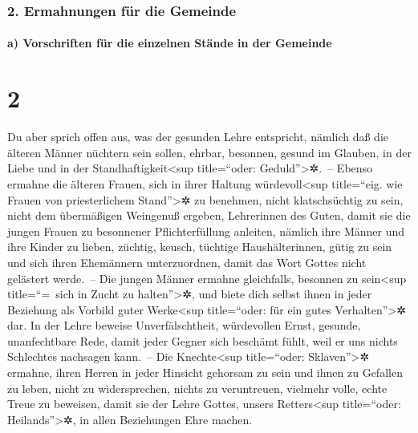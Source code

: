 \hypertarget{ermahnungen-fuxfcr-die-gemeinde}{%
\subsubsection{2. Ermahnungen für die
Gemeinde}\label{ermahnungen-fuxfcr-die-gemeinde}}

\hypertarget{a-vorschriften-fuxfcr-die-einzelnen-stuxe4nde-in-der-gemeinde}{%
\paragraph{a) Vorschriften für die einzelnen Stände in der
Gemeinde}\label{a-vorschriften-fuxfcr-die-einzelnen-stuxe4nde-in-der-gemeinde}}

\hypertarget{section-1}{%
\section{2}\label{section-1}}

 Du aber sprich offen aus, was der gesunden Lehre
entspricht,  nämlich daß die älteren Männer nüchtern sein
sollen, ehrbar, besonnen, gesund im Glauben, in der Liebe und in der
Standhaftigkeit\textless sup title=``oder: Geduld''\textgreater✲.~--
 Ebenso ermahne die älteren Frauen, sich in ihrer Haltung
würdevoll\textless sup title=``eig. wie Frauen von priesterlichem
Stand''\textgreater✲ zu benehmen, nicht klatschsüchtig zu sein, nicht
dem übermäßigen Weingenuß ergeben, Lehrerinnen des Guten, 
damit sie die jungen Frauen zu besonnener Pflichterfüllung anleiten,
nämlich ihre Männer und ihre Kinder zu lieben,  züchtig,
keusch, tüchtige Haushälterinnen, gütig zu sein und sich ihren
Ehemännern unterzuordnen, damit das Wort Gottes nicht gelästert
werde.~--  Die jungen Männer ermahne gleichfalls, besonnen
zu sein\textless sup title=``=~sich in Zucht zu halten''\textgreater✲,
 und biete dich selbst ihnen in jeder Beziehung als
Vorbild guter Werke\textless sup title=``oder: für ein gutes
Verhalten''\textgreater✲ dar. In der Lehre beweise Unverfälschtheit,
würdevollen Ernst,  gesunde, unanfechtbare Rede, damit
jeder Gegner sich beschämt fühlt, weil er uns nichts Schlechtes
nachsagen kann.~--  Die Knechte\textless sup title=``oder:
Sklaven''\textgreater✲ ermahne, ihren Herren in jeder Hinsicht gehorsam
zu sein und ihnen zu Gefallen zu leben, nicht zu widersprechen,
 nichts zu veruntreuen, vielmehr volle, echte Treue zu
beweisen, damit sie der Lehre Gottes, unsers Retters\textless sup
title=``oder: Heilands''\textgreater✲, in allen Beziehungen Ehre machen.

